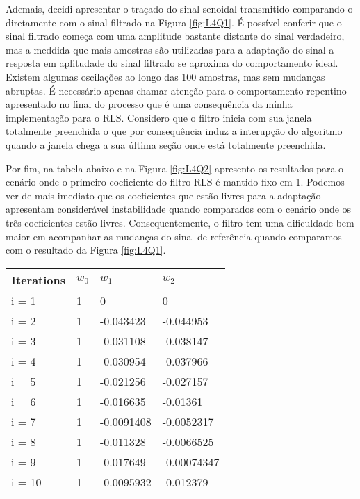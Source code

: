 Ademais, decidi apresentar o traçado do sinal senoidal transmitido 
comparando-o diretamente com o sinal filtrado na Figura \ref{fig:L4Q1}. É possível conferir que o sinal filtrado começa com uma amplitude bastante
distante do sinal verdadeiro, mas a meddida que mais amostras são utilizadas para a adaptação do sinal a resposta em aplitudade do sinal filtrado se
aproxima do comportamento ideal. Existem algumas oscilações ao longo das 100 amostras, mas sem mudanças abruptas. É necessário apenas chamar atenção 
para o comportamento repentino apresentado no final do processo que é uma consequência da minha implementação para o RLS. Considero que o filtro inicia 
com sua janela totalmente preenchida o que por consequência induz a interupção do algoritmo quando a janela chega a sua última seção onde está totalmente preenchida.

Por fim, na tabela abaixo e na Figura \ref{fig:L4Q2} apresento os resultados para o cenário onde o primeiro coeficiente do filtro RLS é mantido fixo em 1.
Podemos ver de mais imediato que os coeficientes que estão livres para a adaptação apresentam considerável instabilidade quando comparados com o cenário onde os três 
coeficientes estão livres. Consequentemente, o filtro tem uma dificuldade bem maior em acompanhar as mudanças do sinal de referência quando comparamos com o
resultado da Figura \ref{fig:L4Q1}.

\begin{table}[!htp]
    \centering
    \begin{tabular}{|l|l|l|l|}
        \hline
        Iterations & $w_{0}$ & $w_{1}$ & $w_{2}$ \\ 
        \hline 
        i = 1 & 1 & 0 & 0 \\ \hline 
        i = 2 & 1 & -0.043423 & -0.044953 \\ \hline 
        i = 3 & 1 & -0.031108 & -0.038147 \\ \hline 
        i = 4 & 1 & -0.030954 & -0.037966 \\ \hline 
        i = 5 & 1 & -0.021256 & -0.027157 \\ \hline 
        i = 6 & 1 & -0.016635 & -0.01361 \\ \hline 
        i = 7 & 1 & -0.0091408 & -0.0052317 \\ \hline 
        i = 8 & 1 & -0.011328 & -0.0066525 \\ \hline 
        i = 9 & 1 & -0.017649 & -0.00074347 \\ \hline 
        i = 10 & 1 & -0.0095932 & -0.012379 \\ \hline 
    \end{tabular}
\end{table}

